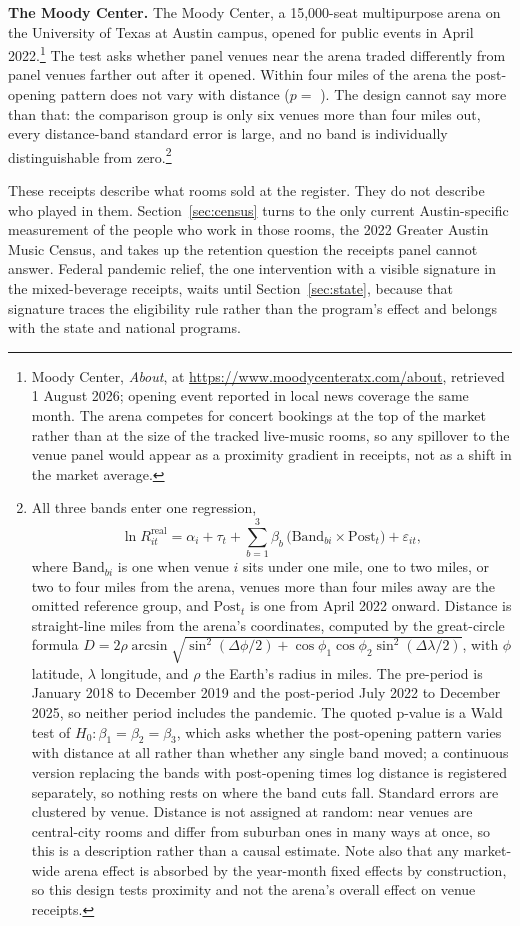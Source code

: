 \textbf{The Moody Center.} The Moody Center, a 15,000-seat multipurpose arena
on the University of Texas at Austin campus, opened for public events in April
2022.\footnote{Moody Center, \textit{About}, at
\url{https://www.moodycenteratx.com/about}, retrieved 1 August 2026; opening
event reported in local news coverage the same month. The arena competes for
concert bookings at the top of the market rather than at the size of the
tracked live-music rooms, so any spillover to the venue panel would appear as
a proximity gradient in receipts, not as a shift in the market average.} The
test asks whether panel venues near the arena traded differently from panel
venues farther out after it opened. Within four miles of the arena the
post-opening pattern does not vary with distance ($p =$
\NQuasiMoodyJointP). The design cannot say more than that: the comparison
group is only six venues more than four miles out, every distance-band standard
error is large, and no band is individually distinguishable from zero.\footnote{All three bands enter one regression,
\[
\ln R^{\mathrm{real}}_{it}
  = \alpha_i + \tau_t
  + \sum_{b=1}^{3} \beta_b\,
    \bigl(\mathrm{Band}_{bi} \times \mathrm{Post}_t\bigr)
  + \varepsilon_{it},
\]
where \(\mathrm{Band}_{bi}\) is one when venue \(i\) sits under one mile, one
to two miles, or two to four miles from the arena, venues more than four miles
away are the omitted reference group, and \(\mathrm{Post}_t\) is one from
April 2022 onward. Distance is straight-line miles from the arena's
coordinates, computed by the great-circle formula
\(D = 2\rho\arcsin\sqrt{\sin^{2}(\Delta\phi/2)
   + \cos\phi_1\cos\phi_2\sin^{2}(\Delta\lambda/2)}\),
with \(\phi\) latitude, \(\lambda\) longitude, and \(\rho\) the Earth's radius
in miles. The pre-period is January 2018 to December 2019 and the post-period
July 2022 to December 2025, so neither period includes the pandemic. The quoted
p-value is a Wald test of \(H_0: \beta_1 = \beta_2 = \beta_3\), which asks
whether the post-opening pattern varies with distance at all rather than
whether any single band moved; a continuous version replacing the bands with
post-opening times log distance is registered separately, so nothing rests on
where the band cuts fall. Standard errors are clustered by venue. Distance is
not assigned at random: near venues are central-city rooms and differ from
suburban ones in many ways at once, so this is a description rather than a
causal estimate. Note also that any market-wide arena effect is absorbed by the
year-month fixed effects by construction, so this design tests proximity and not
the arena's overall effect on venue receipts.}

These receipts describe what rooms sold at the register. They do not describe
who played in them. Section~\ref{sec:census} turns to the only current
Austin-specific measurement of the people who work in those rooms, the 2022
Greater Austin Music Census, and takes up the retention question the receipts
panel cannot answer. Federal pandemic relief, the one intervention with a
visible signature in the mixed-beverage receipts, waits until
Section~\ref{sec:state}, because that signature traces the eligibility rule
rather than the program's effect and belongs with the state and national
programs.
